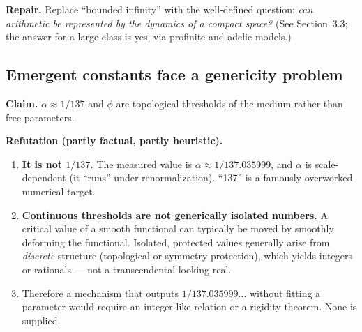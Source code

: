 \documentclass[11pt]{article}
\begin{document}
\noindent\textbf{Repair.} Replace ``bounded infinity'' with the well-defined
question: \emph{can arithmetic be represented by the dynamics of a compact space?}
(See Section~3.3; the answer for a large class is yes, via profinite and adelic
models.)

\subsection{Emergent constants face a genericity problem}

\textbf{Claim.} $\alpha \approx 1/137$ and $\phi$ are topological thresholds of
the medium rather than free parameters.

\noindent\textbf{Refutation (partly factual, partly heuristic).}
\begin{enumerate}[leftmargin=1.6em]
\item \textbf{It is not $1/137$.} The measured value is
$\alpha \approx 1/137.035999$, and $\alpha$ is scale-dependent (it ``runs'' under
renormalization). ``137'' is a famously overworked numerical target.
\item \textbf{Continuous thresholds are not generically isolated numbers.} A
critical value of a smooth functional can typically be moved by smoothly
deforming the functional. Isolated, protected values generally arise from
\emph{discrete} structure (topological or symmetry protection), which yields
integers or rationals --- not a transcendental-looking real.
\item Therefore a mechanism that outputs $1/137.035999\ldots$ without fitting a
parameter would require an integer-like relation or a rigidity theorem. None is
supplied.
\end{enumerate}
\end{document}

